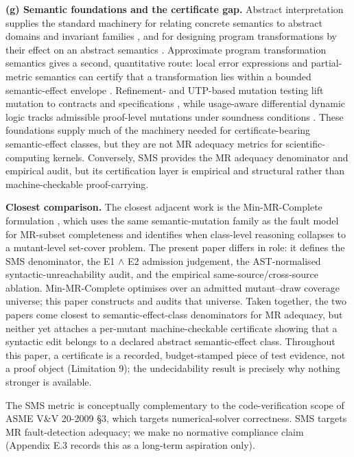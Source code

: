 \documentclass[manuscript,screen,review]{acmart}
\begin{document}
\textbf{(g) Semantic foundations and the certificate gap.} Abstract
interpretation supplies the standard machinery for relating concrete
semantics to abstract domains and invariant families \citep{cousot1992absint},
and for designing program transformations by their effect on an
abstract semantics \citep{cousot2002transform}. Approximate program
transformation semantics gives a second, quantitative route: local error
expressions and partial-metric semantics can certify that a
transformation lies within a bounded semantic-effect envelope \citep{westbrook2013approx,geoffroy2021partialmetric}. Refinement- and
UTP-based mutation testing lift mutation to contracts and
specifications \citep{aichernig2002contract,aichernig2007utp}, while
usage-aware differential dynamic logic tracks admissible proof-level
mutations under soundness conditions \citep{dotzel2023usageaware}. These foundations supply much of the machinery needed for
certificate-bearing semantic-effect classes, but they are not MR
adequacy metrics for scientific-computing kernels. Conversely, SMS
provides the MR adequacy denominator and empirical audit, but its
certification layer is empirical and structural rather than
machine-checkable proof-carrying.

\textbf{Closest comparison.} The closest adjacent work is the
Min-MR-Complete formulation \citep{li2026minmrcomplete}, which uses
the same semantic-mutation family as the fault model for MR-subset
completeness and identifies when class-level reasoning collapses to a
mutant-level set-cover problem. The present paper differs in role: it
defines the SMS denominator, the E1 $\wedge$ E2 admission judgement, the
AST-normalised syntactic-unreachability audit, and the empirical
same-source/cross-source ablation. Min-MR-Complete optimises over an
admitted mutant--draw coverage universe; this paper constructs and
audits that universe. Taken together, the two papers come closest to
semantic-effect-class denominators for MR adequacy, but neither yet
attaches a per-mutant machine-checkable certificate showing that a
syntactic edit belongs to a declared abstract semantic-effect class.
Throughout this paper, a certificate is a recorded, budget-stamped
piece of test evidence, not a proof object (Limitation 9); the
undecidability result is precisely why nothing stronger is available.

The SMS metric is conceptually complementary to the code-verification
scope of ASME V\&V 20-2009 §3, which targets numerical-solver
correctness. SMS targets MR fault-detection adequacy; we make no
normative compliance claim (Appendix E.3 records this as a long-term
aspiration only).
\end{document}
